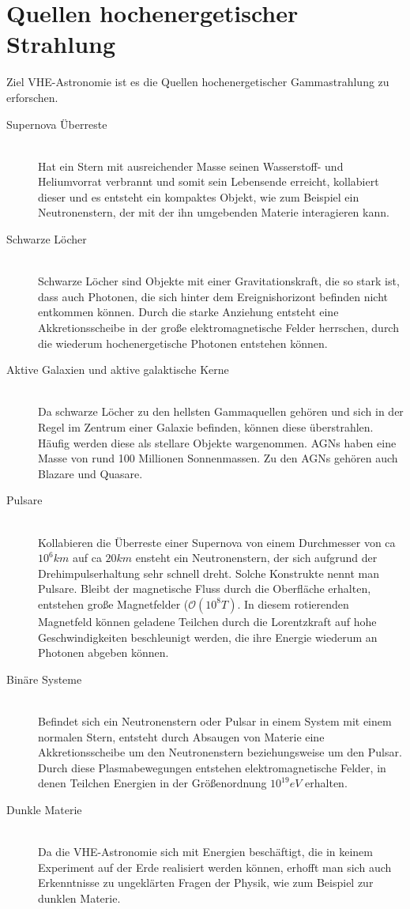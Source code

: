 \section{Quellen hochenergetischer Strahlung}
Ziel VHE-Astronomie ist es die Quellen hochenergetischer Gammastrahlung zu erforschen.

\begin{description}
\item[Supernova Überreste]\hfill \\
Hat ein Stern mit ausreichender Masse seinen Wasserstoff- und Heliumvorrat verbrannt und somit sein Lebensende erreicht, kollabiert dieser und es entsteht ein kompaktes Objekt, wie zum Beispiel ein Neutronenstern, der mit der ihn umgebenden Materie interagieren kann.
\item[Schwarze Löcher]\hfill \\
Schwarze Löcher sind Objekte mit einer Gravitationskraft, die so stark ist, dass auch Photonen, die sich hinter dem Ereignishorizont befinden nicht entkommen können. Durch die starke Anziehung entsteht eine Akkretionsscheibe in der große elektromagnetische Felder herrschen, durch die wiederum hochenergetische Photonen entstehen können.
\item[Aktive Galaxien und aktive galaktische Kerne]\hfill \\
Da schwarze Löcher zu den hellsten Gammaquellen gehören und sich in der Regel im Zentrum einer Galaxie befinden, können diese überstrahlen. Häufig werden diese als stellare Objekte wargenommen. AGNs haben eine Masse von rund 100 Millionen Sonnenmassen. Zu den AGNs gehören auch Blazare und Quasare.
\item[Pulsare]\hfill \\
Kollabieren die Überreste einer Supernova von einem Durchmesser von ca $10^6km$ auf ca $20km$ ensteht ein Neutronenstern, der sich aufgrund der Drehimpulserhaltung sehr schnell dreht. Solche Konstrukte nennt man Pulsare. Bleibt der magnetische Fluss durch die Oberfläche erhalten, entstehen große Magnetfelder ($\mathcal{O}(10^8\unit{T})$\cite{Grupen}. In diesem rotierenden Magnetfeld können geladene Teilchen durch die Lorentzkraft auf hohe Geschwindigkeiten beschleunigt werden, die ihre Energie wiederum an Photonen abgeben können.
\item[Binäre Systeme]\hfill \\ 
Befindet sich ein Neutronenstern oder Pulsar in einem System mit einem normalen Stern, entsteht durch Absaugen von Materie eine Akkretionsscheibe um den Neutronenstern beziehungsweise um den Pulsar. Durch diese Plasmabewegungen entstehen elektromagnetische Felder, in denen Teilchen Energien in der Größenordnung $10^{19} \unit{eV}$\cite{Grupen} erhalten.
\item[Dunkle Materie]\hfill \\
Da die VHE-Astronomie sich mit Energien beschäftigt, die in keinem Experiment auf der Erde realisiert werden können, erhofft man sich auch Erkenntnisse zu ungeklärten Fragen der Physik, wie zum Beispiel zur dunklen Materie.
\end{description}


